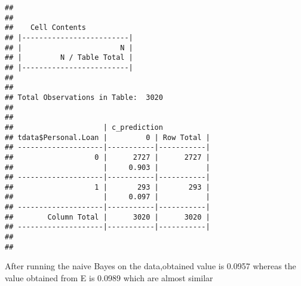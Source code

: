 \documentclass[
]{article}
\begin{document}
\begin{verbatim}
## 
##  
##    Cell Contents
## |-------------------------|
## |                       N |
## |         N / Table Total |
## |-------------------------|
## 
##  
## Total Observations in Table:  3020 
## 
##  
##                     | c_prediction 
## tdata$Personal.Loan |         0 | Row Total | 
## --------------------|-----------|-----------|
##                   0 |      2727 |      2727 | 
##                     |     0.903 |           | 
## --------------------|-----------|-----------|
##                   1 |       293 |       293 | 
##                     |     0.097 |           | 
## --------------------|-----------|-----------|
##        Column Total |      3020 |      3020 | 
## --------------------|-----------|-----------|
## 
## 
\end{verbatim}

After running the naive Bayes on the data,obtained value is 0.0957
whereas the value obtained from E is 0.0989 which are almost similar
\end{document}
